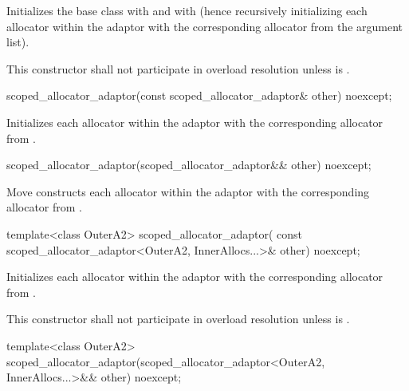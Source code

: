 \begin{itemdescr}
\pnum
\effects
Initializes the  base class with
 and  with 
(hence recursively initializing each allocator within the adaptor with the corresponding
allocator from the argument list).

\pnum
\remarks
This constructor shall not participate in overload resolution unless
 is .
\end{itemdescr}

%
\begin{itemdecl}
scoped_allocator_adaptor(const scoped_allocator_adaptor& other) noexcept;
\end{itemdecl}

\begin{itemdescr}
\pnum
\effects
Initializes each allocator within the adaptor with the corresponding allocator
from .
\end{itemdescr}

%
\begin{itemdecl}
scoped_allocator_adaptor(scoped_allocator_adaptor&& other) noexcept;
\end{itemdecl}

\begin{itemdescr}
\pnum
\effects
Move constructs each allocator within the adaptor with the corresponding allocator
from .
\end{itemdescr}

%
\begin{itemdecl}
template<class OuterA2>
  scoped_allocator_adaptor(
    const scoped_allocator_adaptor<OuterA2, InnerAllocs...>& other) noexcept;
\end{itemdecl}

\begin{itemdescr}
\pnum
\effects
Initializes each allocator within the adaptor with the corresponding allocator
from .

\pnum
\remarks
This constructor shall not participate in overload resolution unless
 is .
\end{itemdescr}

%
\begin{itemdecl}
template<class OuterA2>
  scoped_allocator_adaptor(scoped_allocator_adaptor<OuterA2, InnerAllocs...>&& other) noexcept;
\end{itemdecl}

